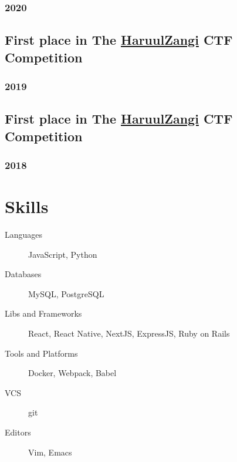 \documentclass[letterpaper]{article}
\begin{document}
\subsubsection{2020}
\label{sec:org3e31c9d}
\subsection{First place in The \href{http:www.haruulzangi.mn}{HaruulZangi} CTF Competition}
\label{sec:orgaf8b4dc}
\subsubsection{2019}
\label{sec:org0b75147}
\subsection{First place in The \href{http:www.haruulzangi.mn}{HaruulZangi} CTF Competition}
\label{sec:org64c836e}
\subsubsection{2018}
\label{sec:orgabb04fb}
\section{Skills}
\label{sec:org1550324}
\begin{description}
\item[{Languages}] JavaScript, Python
\item[{Databases}] MySQL, PostgreSQL
\item[{Libs and Frameworks}] React, React Native, NextJS, ExpressJS, Ruby on Rails
\item[{Tools and Platforms}] Docker, Webpack, Babel
\item[{VCS}] git
\item[{Editors}] Vim, Emacs
\end{description}
\end{document}
